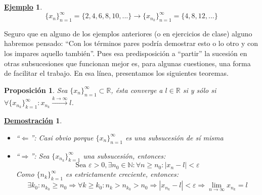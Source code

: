 \documentclass[10pt,a4paper,openright]{book}
\theoremstyle{break}
\newtheorem{prop}{Proposición}[chapter]
\newtheorem*{demo}{\underline{Demostración}}
\newtheorem{ej}{\underline{Ejemplo}}[chapter]
\begin{document}
\begin{ej}
$$\{x_n\}_{n=1}^\infty =\{2,4,6,8,10,...\}\rightarrow \{x_{n_k}\}_{n=1}^\infty =\{4,8,12,...\}$$
\end{ej}

Seguro que en alguno de los ejemplos anteriores (o en ejercicios de clase) alguno habremos pensado: ``Con los términos pares podría demostrar esto o lo otro y con los impares aquello también''. Pues esa predisposición a ``partir'' la sucesión en otras subsucesiones que funcionan mejor es, para algunas cuestiones, una forma de facilitar el trabajo. En esa línea, presentamos los siguientes teoremas.

\begin{prop}
Sea $\{x_n\}_{n=1}^\infty\subset \mathbb R$, ésta converge a $l\in \mathbb R$ si y sólo si $\forall \{x_{n_k}\}_{k=1}^\infty : x_{n_k}\xrightarrow{k\rightarrow \infty} l$.
\end{prop}
\begin{demo}
\begin{itemize}
\item ``$\Leftarrow$'':
	Casi obvio porque $\{x_n\}_{n=1}^\infty$ es una subsucesión de sí misma
	
\item ``$\Rightarrow$'':
	Sea $\{x_{n_k}\}_{k=1}^\infty$ una subsucesión, entonces:
	$$\mbox{Sea }\varepsilon>0, \exists n_0\in \mathbb N: \forall n\geq n_0: \left|x_n-l\right|<\varepsilon$$
	Como $\{n_k\}_{k=1}^\infty$ es estrictamente creciente, entonces:
	$$\exists k_0: n_{k_0}\geq n_0\Rightarrow \forall k\geq k_0: n_k>n_{k_0}>n_0\Rightarrow \left|x_{n_k}-l\right|<\varepsilon\Rightarrow \lim_{n\rightarrow \infty} x_{n_k}=l$$
\end{itemize}
\end{demo}
\end{document}
